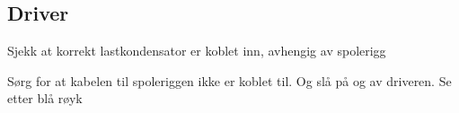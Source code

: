 \subsection{Driver}
\begin{todolist}
    \item{Sjekk at korrekt lastkondensator er koblet inn, avhengig av spolerigg}
    \iftoggle{INTERN}{
        \item{Mas på noen om å fikse limiteren og carrier detection}
    }{
    }
    \item{Sørg for at kabelen til spoleriggen ikke er koblet til. Og slå på og av driveren. Se etter blå røyk}
\end{todolist}